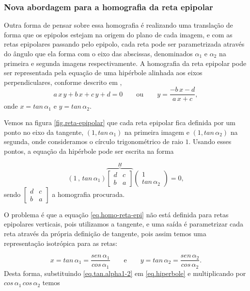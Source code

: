 \subsubsection{Nova abordagem para a homografia da reta epipolar} 


Outra forma de pensar sobre essa homografia é realizando uma translação de forma que os epipolos estejam na origem do plano de cada imagem, e com as retas epipolares passando pelo epipolo, cada reta pode ser parametrizada através do ângulo que ela forma com o eixo das abscissas, denominados $\alpha_1$ e $\alpha_2$ na primeira e segunda imagens respectivamente.
A homografia da reta epipolar pode ser representada pela equação de uma hipérbole alinhada aos eixos perpendiculares, conforme descrito em \cite{Fabbri:Kimia:CVPR10},
\begin{equation}\label{eq.hiperbole}
a\,x\,y+b\,x+c\,y+d=0 \qquad \text{ou} \qquad y=\frac{-b\,x-d}{a\,x+c},
\end{equation} 
onde $x=tan\,\alpha_1$ e $y=tan\,\alpha_2$. 

Vemos na figura \ref{fig.reta-epipolar} que cada reta epipolar fica definida por um ponto no eixo da tangente, $(1,tan\,\alpha_1)$ na primeira imagem e $(1,tan\,\alpha_2)$ na segunda, onde consideramos o círculo trigonométrico de raio $1$. Usando esses pontos, a equação da hipérbole pode ser escrita na forma

\begin{equation}\label{eq.homo-reta-epi}
(1\,,\,tan\,\alpha_1)
\overbrace{
\begin{bmatrix}
d&c\\
b&a
\end{bmatrix}
}^{H}
\begin{pmatrix}
1\\
tan\,\alpha_2
\end{pmatrix}
=0,
\end{equation}
sendo 
$\begin{bmatrix}d&c\\b&a\end{bmatrix}$ a homografia procurada.

O problema é que a equação \ref{eq.homo-reta-epi} não está definida para retas epipolares verticais, pois utilizamos a tangente, e uma saída é parametrizar cada reta através da própria definição de tangente, pois assim temos uma representação isotrópica para as retas:

\begin{equation}\label{eq.tan.alpha1-2}
x=tan\,\alpha_1=\frac{sen\,\alpha_1 }{cos\,\alpha_1} \qquad \text{e} \qquad y=tan\,\alpha_2=\frac{sen\,\alpha_2}{cos\,\alpha_2}.
\end{equation} 
Desta forma, substituindo \ref{eq.tan.alpha1-2} em \ref{eq.hiperbole} e multiplicando por $cos\,\alpha_1\,cos\,\alpha_2$ temos

